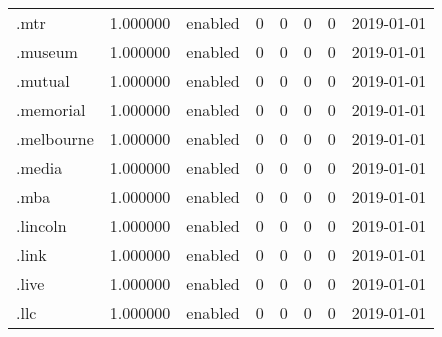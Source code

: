 \begin{tabular}{lrlrrrrl}
.mtr                      &          1.000000 &         enabled &                           0 &                           0 &                           0 &                   0 &           2019-01-01 \\
.museum                   &          1.000000 &         enabled &                           0 &                           0 &                           0 &                   0 &           2019-01-01 \\
.mutual                   &          1.000000 &         enabled &                           0 &                           0 &                           0 &                   0 &           2019-01-01 \\
.memorial                 &          1.000000 &         enabled &                           0 &                           0 &                           0 &                   0 &           2019-01-01 \\
.melbourne                &          1.000000 &         enabled &                           0 &                           0 &                           0 &                   0 &           2019-01-01 \\
.media                    &          1.000000 &         enabled &                           0 &                           0 &                           0 &                   0 &           2019-01-01 \\
.mba                      &          1.000000 &         enabled &                           0 &                           0 &                           0 &                   0 &           2019-01-01 \\
.lincoln                  &          1.000000 &         enabled &                           0 &                           0 &                           0 &                   0 &           2019-01-01 \\
.link                     &          1.000000 &         enabled &                           0 &                           0 &                           0 &                   0 &           2019-01-01 \\
.live                     &          1.000000 &         enabled &                           0 &                           0 &                           0 &                   0 &           2019-01-01 \\
.llc                      &          1.000000 &         enabled &                           0 &                           0 &                           0 &                   0 &           2019-01-01 \\

\end{tabular}

